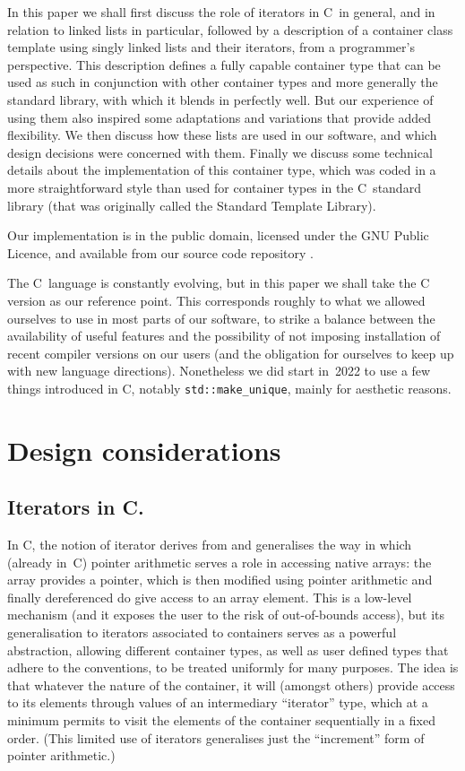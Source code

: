 \documentclass[12pt]{article}
\theoremstyle{plain}
\theoremstyle{definition}
\def\PP{\copy\PPbox}
\newcommand\Cee{\textsc{C}}
\newcommand\Cpp{\Cee\PP}
\newcommand\std[1]{\texttt{std::#1}}
\begin{document}
In this paper we shall first discuss the role of iterators in \Cpp\ in general,
and in relation to linked lists in particular, followed by a description of a
container class template using singly linked lists and their iterators, from a
programmer's perspective. This description defines a fully capable container
type that can be used as such in conjunction with other container types and more
generally the standard library, with which it blends in perfectly well. But our
experience of using them also inspired some adaptations and variations that
provide added flexibility. We then discuss how these lists are used in our
software, and which design decisions were concerned with them. Finally we
discuss some technical details about the implementation of this container type,
which was coded in a more straightforward style than used for container types in
the \Cpp\ standard library (that was originally called the Standard Template
Library).

Our implementation is in the public domain, licensed under the GNU
Public Licence, and available from our source code repository \cite{Atlas
  source}.

The \Cpp\ language is constantly evolving, but in this paper we shall take the
\Cpp11 version as our reference point. This corresponds roughly to what we
allowed ourselves to use in most parts of our software, to strike a balance
between the availability of useful features and the possibility of not imposing
installation of recent compiler versions on our users (and the obligation for
ourselves to keep up with new language directions). Nonetheless we did start
in~2022 to use a few things introduced in \Cpp14, notably \std{make\_unique},
mainly for aesthetic reasons.

\section{Design considerations}
\subsection{Iterators in \Cpp.}

In \Cpp, the notion of iterator derives from and generalises the way in which
(already in~\Cee) pointer arithmetic serves a role in accessing native arrays:
the array provides a pointer, which is then modified using pointer arithmetic
and finally dereferenced do give access to an array element. This is a low-level
mechanism (and it exposes the user to the risk of out-of-bounds access), but its
generalisation to iterators associated to containers serves as a powerful
abstraction, allowing different container types, as well as user defined types
that adhere to the conventions, to be treated uniformly for many purposes. The
idea is that whatever the nature of the container, it will (amongst others)
provide access to its elements through values of an intermediary ``iterator''
type, which at a minimum permits to visit the elements of the container
sequentially in a fixed order. (This limited use of iterators generalises just
the ``increment'' form of pointer arithmetic.)
\end{document}
